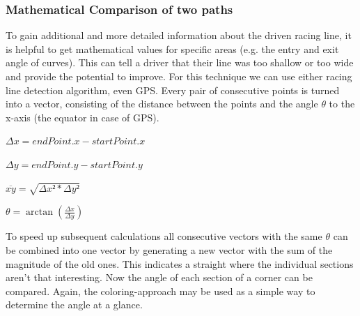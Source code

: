 \subsubsection{Mathematical Comparison of two paths}
To gain additional and more detailed information about the driven racing line, it is helpful to get mathematical values for specific areas (e.g. the entry and exit angle of curves). This can tell a driver that their line was too shallow or too wide and provide the potential to improve.
For this technique we can use either racing line detection algorithm, even GPS. Every pair of consecutive points is turned into a vector, consisting of the distance between the points and the angle $\theta$ to the x-axis (the equator in case of GPS).
\begin{center}
$\Delta x = endPoint.x - startPoint.x$

$\Delta y = endPoint.y - startPoint.y$

$\overline{xy} = \sqrt{\Delta x² * \Delta y²}$

$\theta = \arctan(\frac{\Delta x}{\Delta y})$ 
\end{center}

To speed up subsequent calculations all consecutive vectors with the same $\theta$ can be combined into one vector by generating a new vector with the sum of the magnitude of the old ones. This indicates a straight where the individual sections aren't that interesting.
Now the angle of each section of a corner can be compared. Again, the coloring-approach may be used as a simple way to determine the angle at a glance.
\clearpage
